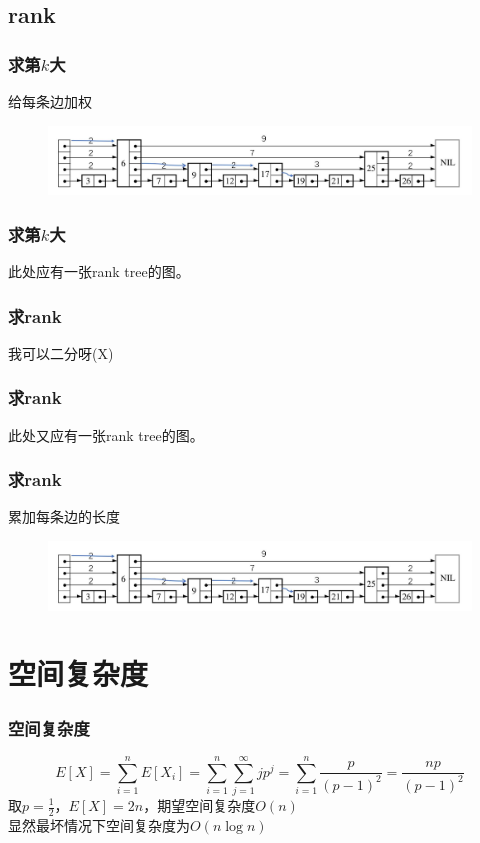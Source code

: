 \documentclass{beamer}
\begin{document}
	\subsection{rank}

	\begin{frame}
		\frametitle{求第$k$大}
		给每条边加权
		\begin{figure}[H]
			\includegraphics[scale=0.2]{./img/rank.jpg}
		\end{figure}
	\end{frame}

	\begin{frame}
		\frametitle{求第$k$大}
		此处应有一张rank tree的图。
	\end{frame}

	\begin{frame}
		\frametitle{求rank}
		我可以二分呀(X)
	\end{frame}

	\begin{frame}
		\frametitle{求rank}
		此处又应有一张rank tree的图。
	\end{frame}


	\begin{frame}
		\frametitle{求rank}
		累加每条边的长度
		\begin{figure}[H]
			\includegraphics[scale=0.2]{./img/rank.jpg}
		\end{figure}
	\end{frame}


	


	\section{空间复杂度}
	\begin{frame}
		\frametitle{空间复杂度}
		$$E[X] = \sum_{i=1}^{n}E[X_{i}] = \sum_{i=1}^{n}\sum_{j=1}^{\infty}jp^{j} = \sum_{i=1}^{n}\frac{p}{(p-1)^2} = \frac{np}{(p-1)^2}$$
		取$p=\frac{1}{2}$，$E[X] = 2n$，期望空间复杂度$O(n)$ \\
		显然最坏情况下空间复杂度为$O(n\log n)$
	\end{frame}
\end{document}
